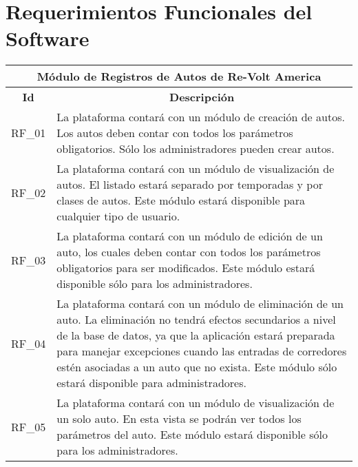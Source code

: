 \section{Requerimientos Funcionales del Software}

\begin{center}
	\begin{tabular}{ | l | p{15cm} |}
		\hline
		\multicolumn{2}{|c|}{\textbf{Módulo de Registros de Autos de Re-Volt America}} \\
		\hline
		\multicolumn{1}{|c|}{\textbf{Id}} & \multicolumn{1}{|c|}{\textbf{Descripción}} \\
		\hline
		RF\_01 & La plataforma contará con un módulo de creación de autos. Los autos deben contar con todos los parámetros obligatorios. Sólo los administradores pueden crear autos. \\ \hline

		RF\_02 & La plataforma contará con un módulo de visualización de autos. El listado estará separado por temporadas y por clases de autos. Este módulo estará disponible para cualquier tipo de usuario. \\ \hline

		RF\_03 & La plataforma contará con un módulo de edición de un auto, los cuales deben contar con todos los parámetros obligatorios para ser modificados. Este módulo estará disponible sólo para los administradores. \\ \hline
		
		RF\_04 & La plataforma contará con un módulo de eliminación de un auto. La eliminación no tendrá efectos secundarios a nivel de la base de datos, ya que la aplicación estará preparada para manejar excepciones cuando las entradas de corredores estén asociadas a un auto que no exista. Este módulo sólo estará disponible para administradores. \\ \hline
		
		RF\_05 & La plataforma contará con un módulo de visualización de un solo auto. En esta vista se podrán ver todos los parámetros del auto. Este módulo estará disponible sólo para los administradores. \\ \hline
	\end{tabular}
\end{center}

